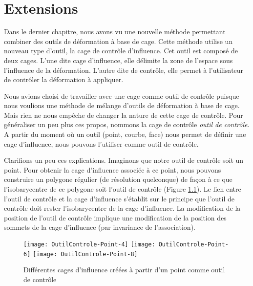 

\chapter{Extensions}

\graphicspath{ {Chapter4/Chapter4Figs/PNG/}
  {Chapter4/Chapter4Figs/PDF/} {Chapter4/Chapter4Figs/} }

Dans le dernier chapitre, nous avons vu une nouvelle méthode permettant
combiner des outils de déformation à base de cage. Cette méthode utilise un
nouveau type d'outil, la cage de contrôle d'influence. Cet outil est composé
de deux cages. L'une dite cage d'influence, elle délimite la zone de l'espace
sous l'influence de la déformation. L'autre dite de contrôle, elle permet à
l'utilisateur de contrôler la déformation à appliquer.

Nous avions choisi de travailler avec une cage comme outil de contrôle puisque
nous voulions une méthode de mélange d'outils de déformation à base de cage.
Mais rien ne nous empêche de changer la nature de cette cage de contrôle. Pour
généraliser un peu plus ces propos, nommons la cage de contrôle \textit{outil
de contrôle}. A partir du moment où un outil (point, courbe, face) nous permet
de définir une cage d'influence, nous pouvons l'utiliser comme outil de
contrôle.

Clarifions un peu ces explications. Imaginons que notre outil de contrôle soit
un point. Pour obtenir la cage d'influence associée à ce point, nous pouvons
construire un polygone régulier (de résolution quelconque) de façon à ce que
l'isobarycentre de ce polygone soit l'outil de contrôle (Figure \ref{EXTPoi}).
Le lien entre l'outil de contrôle et la cage d'influence s'établit sur le
principe que l'outil de contrôle doit rester l'isobarycentre de la cage
d'influence. La modification de la position de l'outil de contrôle implique une
modification de la position des sommets de la cage d'influence (par
invariance de l'association).

\begin{figure}[ht]
\begin{center}
  \texttt{[image: OutilControle-Point-4]}
  \texttt{[image: OutilControle-Point-6]}
  \texttt{[image: OutilControle-Point-8]}

  \caption[Cages d'influence à partir d'un point] {Différentes cages
d'influence créées à partir d'un point comme outil de contrôle}
  \label{EXTPoi}

\end{center}
\end{figure}
